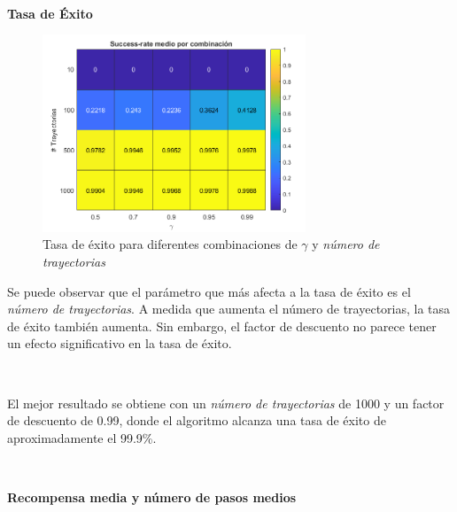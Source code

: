 \

\textbf{Tasa de Éxito}

\begin{figure}[H]
    \centering
    \includegraphics[width=0.7\textwidth]{../../experiments/directEstimation/experiment-1/results/success.png}
    \caption{Tasa de éxito para diferentes combinaciones de $\gamma$ y \textit{número de trayectorias}}
    \label{fig:directEstimation1-success}
\end{figure}

Se puede observar que el parámetro que más afecta a la tasa de éxito es el \textit{número de trayectorias}. A medida que aumenta el número de trayectorias, la tasa de éxito también aumenta. Sin embargo, el factor de descuento no parece tener un efecto significativo en la tasa de éxito.

\

El mejor resultado se obtiene con un \textit{número de trayectorias} de 1000 y un factor de descuento de 0.99, donde el algoritmo alcanza una tasa de éxito de aproximadamente el 99.9\%.

\

\textbf{Recompensa media y número de pasos medios}

